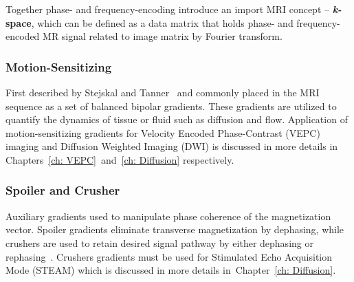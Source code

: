 Together phase- and frequency-encoding introduce an import MRI concept -- \textbf{\mbox{\textit{k-}space}}, which can be defined as a data matrix that holds phase- and frequency-encoded MR signal related to image matrix by Fourier transform.
\subsubsection{Motion-Sensitizing}
First described by Stejskal and Tanner~\cite{Stejskal} and commonly placed in the MRI sequence as a set of balanced bipolar gradients. 
These gradients are utilized to quantify the dynamics of  tissue or fluid such as diffusion and flow. 
Application of motion-sensitizing gradients for Velocity Encoded Phase-Contrast (VEPC) imaging and Diffusion Weighted Imaging (DWI) is discussed in more details in Chapters~\ref{ch: VEPC}~and~\ref{ch: Diffusion} respectively.
\subsubsection{Spoiler and Crusher}
Auxiliary gradients used to manipulate phase coherence of the magnetization vector. 
Spoiler gradients eliminate transverse magnetization by dephasing, while crushers are used to retain desired signal pathway by either dephasing or rephasing~\cite{RNDT24}. 
Crushers gradients must be used for Stimulated Echo Acquisition Mode (STEAM) which is discussed in more details in~Chapter~\ref{ch: Diffusion}.